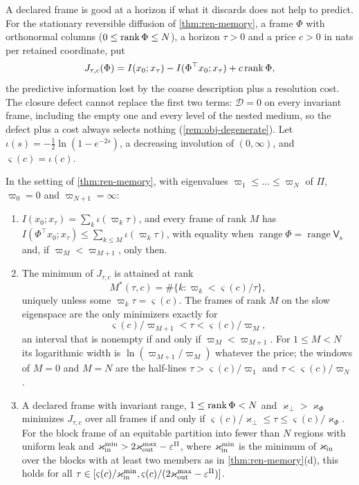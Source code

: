 A declared frame is good at a horizon if what it discards does not help to predict. For the stationary reversible diffusion of \cref{thm:ren-memory}, a frame $\Phi$ with orthonormal columns ($0\le\operatorname{rank}\Phi\le N$), a horizon $\tau>0$ and a price $c>0$ in nats per retained coordinate, put
\begin{equation}\label{eq:obj-criterion}
J_{\tau,c}(\Phi)=I(x_0;x_\tau)-I(\Phi^\top x_0;x_\tau)+c\operatorname{rank}\Phi,
\end{equation}
the predictive information lost by the coarse description plus a resolution cost. The closure defect cannot replace the first two terms: $\mathcal D=0$ on every invariant frame, including the empty one and every level of the nested medium, so the defect plus a cost always selects nothing (\cref{rem:obj-degenerate}). Let $\iota(s)=-\frac12\ln(1-e^{-2s})$, a decreasing involution of $(0,\infty)$, and $\varsigma(c)=\iota(c)$.

\begin{theorem}\label{thm:obj-selection}
In the setting of \cref{thm:ren-memory}, with eigenvalues $\varpi_1\le\dots\le\varpi_N$ of $\Pi$, $\varpi_0=0$ and $\varpi_{N+1}=\infty$:
\begin{enumerate}
\item[(a)] $I(x_0;x_\tau)=\sum_k\iota(\varpi_k\tau)$, and every frame of rank $M$ has $I(\Phi^\top x_0;x_\tau)\le\sum_{k\le M}\iota(\varpi_k\tau)$, with equality when $\operatorname{range}\Phi=\operatorname{range}\mathsf V_{\mathrm s}$ and, if $\varpi_M<\varpi_{M+1}$, only then.
\item[(b)] The minimum of $J_{\tau,c}$ is attained at rank
\begin{equation}\label{eq:obj-rank}
M^\ast(\tau,c)=\#\{k:\varpi_k<\varsigma(c)/\tau\},
\end{equation}
uniquely unless some $\varpi_k\tau=\varsigma(c)$. The frames of rank $M$ on the slow eigenspace are the only minimizers exactly for
\begin{equation}\label{eq:obj-windows}
\varsigma(c)/\varpi_{M+1}<\tau<\varsigma(c)/\varpi_M,
\end{equation}
an interval that is nonempty if and only if $\varpi_M<\varpi_{M+1}$. For $1\le M<N$ its logarithmic width is $\ln(\varpi_{M+1}/\varpi_M)$ whatever the price; the windows of $M=0$ and $M=N$ are the half-lines $\tau>\varsigma(c)/\varpi_1$ and $\tau<\varsigma(c)/\varpi_N$.
\item[(c)] A declared frame with invariant range, $1\le\operatorname{rank}\Phi<N$ and $\varkappa_\perp>\varkappa_\Phi$ minimizes $J_{\tau,c}$ over all frames if and only if $\varsigma(c)/\varkappa_\perp\le\tau\le\varsigma(c)/\varkappa_\Phi$. For the block frame of an equitable partition into fewer than $N$ regions with uniform leak and $\varkappa_{\mathrm{in}}^{\min}>2\varkappa_{\mathrm{out}}^{\max}-\varepsilon^\Pi$, where $\varkappa_{\mathrm{in}}^{\min}$ is the minimum of $\varkappa_{\mathrm{in}}$ over the blocks with at least two members as in \cref{thm:ren-memory}(d), this holds for all $\tau\in[\varsigma(c)/\varkappa_{\mathrm{in}}^{\min},\varsigma(c)/(2\varkappa_{\mathrm{out}}^{\max}-\varepsilon^\Pi)]$.
\end{enumerate}
\end{theorem}

